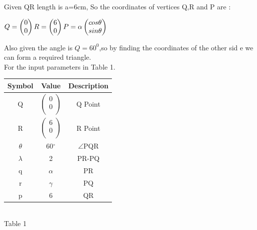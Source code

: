 \documentclass[10pt,a4paper]{article}
\begin{document}
\begin{multicols}{2}
Given QR length is a=6cm,
So the coordinates of vertices  Q,R and P are :\vspace{2mm}\\
\begin{center}$
{
 Q =\begin{pmatrix}
0 \\
0 
\end{pmatrix} 
\vspace{1mm}
R=\begin{pmatrix}
6 \\
0 
\end{pmatrix} 
\vspace{1mm}
P=\alpha\begin{pmatrix}
cos \theta\\
  sin \theta\\
\end{pmatrix} }
\vspace{1mm}$
\end{center}
Also given the angle is $Q=60^0$,so by finding the coordinates of the other sid
    e we can form a required triangle. \\
 \vspace{2mm}
For the input parameters in Table 1.\\
{\setlength\extrarowheight{2pt}
\begin{center}
\begin{tabular}{|c|c|c|}
	\hline
	\textbf{Symbol}&\textbf{Value}&\textbf{Description}\\
	\hline
	Q&$\begin{pmatrix}
	0\\0\\
	\end{pmatrix} $& Q Point\\
	\hline
	R&$\begin{pmatrix}
	6\\0\\
	\end{pmatrix} $& R Point\\
	\hline
	$\theta$&60$^{\circ}$&$\angle$PQR\\
	\hline
	$\lambda$ & 2 & PR-PQ\\
	\hline
	q&$\alpha$  & PR\\
	\hline
	r &$\gamma$  & PQ\\
	\hline
	p & 6 & QR\\
	\hline
\end{tabular}
\\ {Table 1}\\

\end{center}}
\end{multicols}
\end{document}
